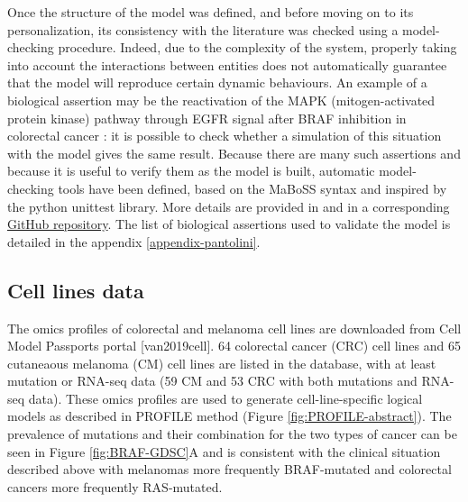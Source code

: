 \documentclass[a4paper,12pt,twoside,onecolumn,openright,final,oldfontcommands]{memoir}
\begin{document}
Once the structure of the model was defined, and before moving on to its
personalization, its consistency with the literature was checked using a
model-checking procedure. Indeed, due to the complexity of the system,
properly taking into account the interactions between entities does not
automatically guarantee that the model will reproduce certain dynamic
behaviours. An example of a biological assertion may be the reactivation
of the MAPK (mitogen-activated protein kinase) pathway through EGFR
signal after BRAF inhibition in colorectal cancer
\citep{prahallad2012unresponsiveness}: it is possible to check whether a
simulation of this situation with the model gives the same result.
Because there are many such assertions and because it is useful to
verify them as the model is built, automatic model-checking tools have
been defined, based on the MaBoSS syntax and inspired by the python
unittest library. More details are provided in
\citet{beal2020personalized} and in a corresponding
\href{https://github.com/sysbio-curie/MaBoSS_test}{GitHub repository}.
The list of biological assertions used to validate the model is detailed
in the appendix \ref{appendix-pantolini}.

\subsection{Cell lines data}\label{cell-lines-data}

The omics profiles of colorectal and melanoma cell lines are downloaded
from Cell Model Passports portal {[}van2019cell{]}. 64 colorectal cancer
(CRC) cell lines and 65 cutaneaous melanoma (CM) cell lines are listed
in the database, with at least mutation or RNA-seq data (59 CM and 53
CRC with both mutations and RNA-seq data). These omics profiles are used
to generate cell-line-specific logical models as described in PROFILE
method (Figure \ref{fig:PROFILE-abstract}). The prevalence of mutations
and their combination for the two types of cancer can be seen in Figure
\ref{fig:BRAF-GDSC}A and is consistent with the clinical situation
described above with melanomas more frequently BRAF-mutated and
colorectal cancers more frequently RAS-mutated.
\end{document}
